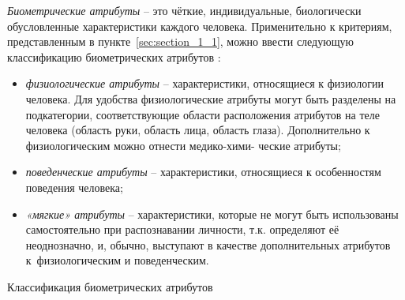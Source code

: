\documentclass[12pt]{book}
\begin{document}
\large{\textit{Биометрические атрибуты} -- это чёткие, индивидуальные, биологически обусловленные характеристики каждого человека. Применительно к критериям, представленным в пункте~\ref{sec:section_1_1}, можно ввести следующую классификацию биометрических атрибутов \cite{unar_2014}:

\begin{itemize}[topsep=1pt] \itemsep0.1em
\item \textit{физиологические атрибуты} -- характеристики, относящиеся к физиологии человека. Для удобства физиологические атрибуты могут быть разделены на подкатегории, соответствующие области расположения атрибутов на теле человека (область руки, область лица, область глаза). Дополнительно к физиологическим можно отнести медико-хими- ческие атрибуты;
\item \textit{поведенческие атрибуты} -- характеристики, относящиеся к особенностям поведения человека;
\item \textit{«мягкие» атрибуты} -- характеристики, которые не могут быть использованы самостоятельно при распознавании личности, т.к. определяют её неоднозначно, и, обычно, выступают в качестве дополнительных атрибутов к~физиологическим и поведенческим.
\end{itemize}

\begin{table}[h]
\centering
\caption{\label{tab:table_1_2}Классификация биометрических атрибутов}


\end{table}}
\end{document}
